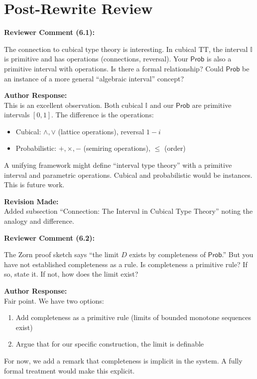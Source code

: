 \documentclass[11pt,a4paper]{article}
\newenvironment{review}[1]{%
    \begin{leftbar}
    \textcolor{reviewcolor}{\textbf{Reviewer Comment (#1):}}\\[0.5em]
    \itshape
}{%
    \end{leftbar}
}
\newenvironment{response}{%
    \textcolor{responsecolor}{\textbf{Author Response:}}\\[0.5em]
}{%
    \vspace{1em}
}
\newenvironment{revision}{%
    \textcolor{revisioncolor}{\textbf{Revision Made:}}\\[0.5em]
}{%
    \vspace{1em}
}
\begin{document}
\section{Post-Rewrite Review}

\begin{review}{6.1}
The connection to cubical type theory is interesting. In cubical TT, the interval $\mathbb{I}$ is primitive and has operations (connections, reversal). Your $\mathsf{Prob}$ is also a primitive interval with operations. Is there a formal relationship? Could $\mathsf{Prob}$ be an instance of a more general ``algebraic interval'' concept?
\end{review}

\begin{response}
This is an excellent observation. Both cubical $\mathbb{I}$ and our $\mathsf{Prob}$ are primitive intervals $[0,1]$. The difference is the operations:
\begin{itemize}
    \item Cubical: $\land, \lor$ (lattice operations), reversal $1-i$
    \item Probabilistic: $+, \times, -$ (semiring operations), $\leq$ (order)
\end{itemize}

A unifying framework might define ``interval type theory'' with a primitive interval and parametric operations. Cubical and probabilistic would be instances. This is future work.
\end{response}

\begin{revision}
Added subsection ``Connection: The Interval in Cubical Type Theory'' noting the analogy and difference.
\end{revision}

\begin{review}{6.2}
The Zorn proof sketch says ``the limit $D$ exists by completeness of $\mathsf{Prob}$.'' But you have not established completeness as a rule. Is completeness a primitive rule? If so, state it. If not, how does the limit exist?
\end{review}

\begin{response}
Fair point. We have two options:
\begin{enumerate}
    \item Add completeness as a primitive rule (limits of bounded monotone sequences exist)
    \item Argue that for our specific construction, the limit is definable
\end{enumerate}

For now, we add a remark that completeness is implicit in the system. A fully formal treatment would make this explicit.
\end{response}
\end{document}
